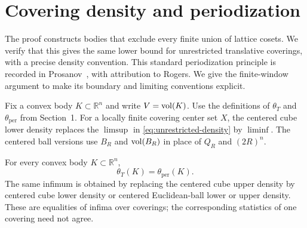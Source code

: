 \section{Covering density and periodization}
\label{sec:periodization}

The proof constructs bodies that exclude every finite union of lattice
cosets. We verify that this gives the same lower bound for unrestricted
translative coverings, with a precise density convention. This standard
periodization principle is recorded in Prosanov~\cite[Theorem~2.1]{Prosanov2021PackingCovering},
with attribution to Rogers. We give the finite-window argument to make
its boundary and limiting conventions explicit.

Fix a convex body $K\subset\mathbb R^n$ and write $V=\operatorname{vol}(K)$.
Use the definitions of $\theta_T$ and $\theta_{\mathrm{per}}$ from
Section~1. For a locally finite covering center set $X$, the centered
cube lower density replaces the $\limsup$ in
\eqref{eq:unrestricted-density} by $\liminf$. The centered ball
versions use $B_R$ and $\operatorname{vol}(B_R)$ in place of $Q_R$ and $(2R)^n$.

\begin{proposition}[Periodization]
\label{prop:periodization}
For every convex body $K\subset\mathbb R^n$,
\[
 \theta_T(K)=\theta_{\mathrm{per}}(K).
\]
The same infimum is obtained by replacing the centered cube upper density
by centered cube lower density or centered Euclidean-ball lower or upper
density. These are equalities of infima over coverings; the corresponding
statistics of one covering need not agree.
\end{proposition}

